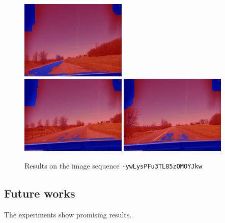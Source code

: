 \documentclass[a4paper,twoside,10pt]{article}
\begin{document}
\begin{figure}
  \includegraphics[width=0.45\textwidth]{result_11.png}
  \\
  \includegraphics[width=0.45\textwidth]{result_13.png}
  \includegraphics[width=0.45\textwidth]{result_15.png}
  \caption{Results on the image sequence \texttt{-ywLysPFu3TL85zOMOYJkw}}
	\label{fig:results}
\end{figure}



\subsection{Future works}
The experiments show promising results.
\end{document}
